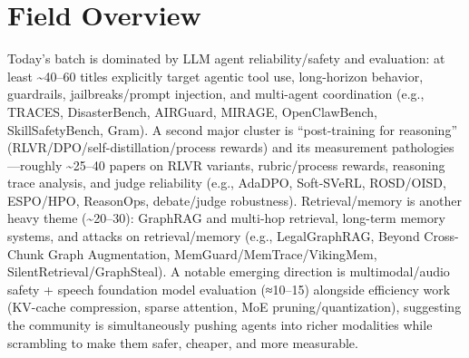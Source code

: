 \documentclass[12pt,letterpaper]{article}
\begin{document}
\section*{Field Overview}
{\footnotesize Today's batch is dominated by LLM agent reliability/safety and evaluation: at least \textasciitilde{}40--60 titles explicitly target agentic tool use, long-horizon behavior, guardrails, jailbreaks/prompt injection, and multi-agent coordination (e.g., TRACES, DisasterBench, AIRGuard, MIRAGE, OpenClawBench, SkillSafetyBench, Gram). A second major cluster is ``post-training for reasoning'' (RLVR/DPO/self-distillation/process rewards) and its measurement pathologies---roughly \textasciitilde{}25--40 papers on RLVR variants, rubric/process rewards, reasoning trace analysis, and judge reliability (e.g., AdaDPO, Soft-SVeRL, ROSD/OISD, ESPO/HPO, ReasonOps, debate/judge robustness). Retrieval/memory is another heavy theme (\textasciitilde{}20--30): GraphRAG and multi-hop retrieval, long-term memory systems, and attacks on retrieval/memory (e.g., LegalGraphRAG, Beyond Cross-Chunk Graph Augmentation, MemGuard/MemTrace/VikingMem, SilentRetrieval/GraphSteal). A notable emerging direction is multimodal/audio safety + speech foundation model evaluation (≈10--15) alongside efficiency work (KV-cache compression, sparse attention, MoE pruning/quantization), suggesting the community is simultaneously pushing agents into richer modalities while scrambling to make them safer, cheaper, and more measurable.}
\end{document}

